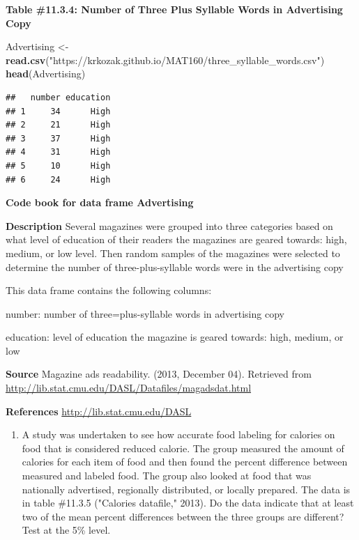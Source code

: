 \documentclass[
]{book}
\newenvironment{Shaded}{\begin{snugshade}}{\end{snugshade}}
\newcommand{\KeywordTok}[1]{\textcolor[rgb]{0.13,0.29,0.53}{\textbf{#1}}}
\newcommand{\NormalTok}[1]{#1}
\newcommand{\StringTok}[1]{\textcolor[rgb]{0.31,0.60,0.02}{#1}}
\providecommand{\tightlist}{%
  \setlength{\itemsep}{0pt}\setlength{\parskip}{0pt}}
\begin{document}
\textbf{Table \#11.3.4: Number of Three Plus Syllable Words in Advertising Copy}

\begin{Shaded}
\begin{Highlighting}[]
\NormalTok{Advertising <-}\StringTok{ }\KeywordTok{read.csv}\NormalTok{(}\StringTok{"https://krkozak.github.io/MAT160/three_syllable_words.csv"}\NormalTok{)}
\KeywordTok{head}\NormalTok{(Advertising)}
\end{Highlighting}
\end{Shaded}

\begin{verbatim}
##   number education
## 1     34      High
## 2     21      High
## 3     37      High
## 4     31      High
## 5     10      High
## 6     24      High
\end{verbatim}

\textbf{Code book for data frame Advertising}

\textbf{Description}
Several magazines were grouped into three categories based on what level of education of their readers the magazines are geared towards: high, medium, or low level. Then random samples of the magazines were selected to determine the number of three-plus-syllable words were in the advertising copy

This data frame contains the following columns:

number: number of three=plus-syllable words in advertising copy

education: level of education the magazine is geared towards: high, medium, or low

\textbf{Source}
Magazine ads readability. (2013, December 04). Retrieved from \url{http://lib.stat.cmu.edu/DASL/Datafiles/magadsdat.html}

\textbf{References}
\url{http://lib.stat.cmu.edu/DASL}

\begin{enumerate}
\def\labelenumi{\arabic{enumi}.}
\setcounter{enumi}{3}
\tightlist
\item
  A study was undertaken to see how accurate food labeling for calories on food that is considered reduced calorie. The group measured the amount of calories for each item of food and then found the percent difference between measured and labeled food. The group also looked at food that was nationally advertised, regionally distributed, or locally prepared. The data is in table \#11.3.5 ("Calories datafile," 2013). Do the data indicate that at least two of the mean percent differences between the three groups are different? Test at the 5\% level.
\end{enumerate}
\end{document}
